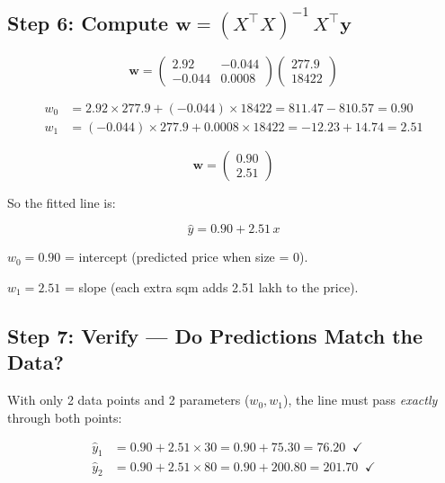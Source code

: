 \documentclass[11pt, a4paper]{article}
\begin{document}
\subsection*{Step 6: Compute $\mathbf{w} = (X^\top X)^{-1} \, X^\top \mathbf{y}$}

\begin{equation}
\mathbf{w} = \begin{pmatrix} 2.92 & -0.044 \\ -0.044 & 0.0008 \end{pmatrix}
\begin{pmatrix} 277.9 \\ 18422 \end{pmatrix}
\tag{N-9}
\end{equation}

\begin{align}
w_0 &= 2.92 \times 277.9 + (-0.044) \times 18422 = 811.47 - 810.57 = \mathbf{0.90} \tag{N-9a} \\
w_1 &= (-0.044) \times 277.9 + 0.0008 \times 18422 = -12.23 + 14.74 = \mathbf{2.51} \tag{N-9b}
\end{align}

\begin{equation}
\boxed{\mathbf{w} = \begin{pmatrix} 0.90 \\ 2.51 \end{pmatrix}}
\tag{N-10}
\end{equation}

So the fitted line is:

\begin{equation}
\hat{y} = 0.90 + 2.51 \, x
\tag{N-11}
\end{equation}

$w_0 = 0.90$ = intercept (predicted price when size = 0).

$w_1 = 2.51$ = slope (each extra sqm adds 2.51 lakh to the price).


\subsection*{Step 7: Verify --- Do Predictions Match the Data?}

With only 2 data points and 2 parameters ($w_0, w_1$), the line must pass \emph{exactly} through both points:

\begin{align}
\hat{y}_1 &= 0.90 + 2.51 \times 30 = 0.90 + 75.30 = 76.20 \;\; \checkmark \tag{N-12a} \\
\hat{y}_2 &= 0.90 + 2.51 \times 80 = 0.90 + 200.80 = 201.70 \;\; \checkmark \tag{N-12b}
\end{align}
\end{document}
